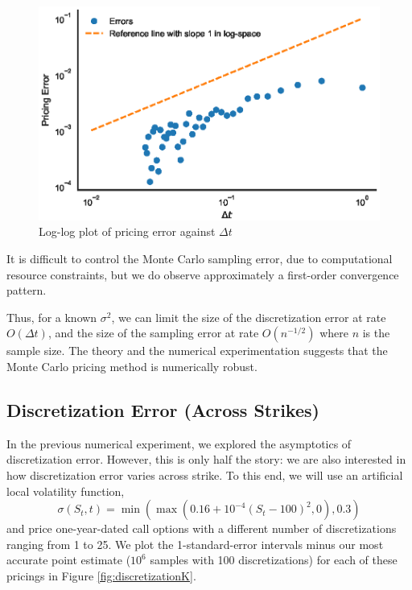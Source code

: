 \documentclass[11pt]{article}
\numberwithin{equation}{section}
\begin{document}
\begin{figure}[h!]
    \centering
    \includegraphics{figs/montecarlo_discrete.eps}
    \caption{Log-log plot of pricing error against $\Delta t$}
    \label{fig:log-log}
\end{figure}

It is difficult to control the Monte Carlo sampling error, due to computational
resource constraints, but we do observe approximately a first-order convergence
pattern. 
  
Thus, for a known $\sigma^2$, we can limit the size of the discretization error
at rate $O(\Delta t)$, and the size of the sampling error at rate $O(n^{-1/2})$
where $n$ is the sample size. The theory and the numerical experimentation
suggests that the Monte Carlo pricing method is numerically robust. 

\subsection{Discretization Error (Across Strikes)}

In the previous numerical experiment, we explored the asymptotics of
discretization error. However, this is only half the story: we are also
interested in how discretization error varies across strike. To this end, we
will use an artificial local volatility function, \[ \sigma(S_t, t) =
\min(\max(0.16 + 10^{-4}(S_t - 100)^2, 0), 0.3) \] and price one-year-dated call
options with a different number of discretizations ranging from 1 to 25. We plot
the 1-standard-error intervals minus our most accurate point estimate ($10^6$
samples with 100 discretizations) for each of these pricings in Figure
\ref{fig:discretizationK}.
\end{document}
